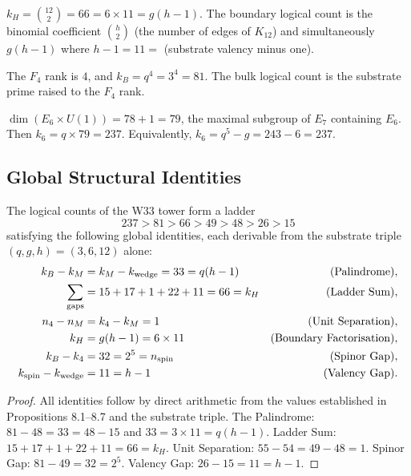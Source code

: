 \begin{proposition}[Boundary: $k_H = 66 = \binom{h}{2} = g(h-1)$]
$k_H = \binom{12}{2} = 66 = 6 \times 11 = g(h-1)$.
The boundary logical count is the binomial coefficient $\binom{h}{2}$
(the number of edges of $K_{12}$) and simultaneously $g(h-1)$
where $h-1 = 11 = $ (substrate valency minus one).
\end{proposition}

\begin{proposition}[Bulk: $k_B = 81 = q^{\mathrm{rank}(F_4)} = 3^4$]
The $F_4$ rank is $4$, and $k_B = q^4 = 3^4 = 81$.
The bulk logical count is the substrate prime raised to the
$F_4$ rank.
\end{proposition}

\begin{proposition}[Sixth: $k_6 = 237 = q \cdot \dim(E_6 \times U(1)) = 3 \times 79$]
$\dim(E_6 \times U(1)) = 78 + 1 = 79$, the maximal subgroup
of $E_7$ containing $E_6$.
Then $k_6 = q \times 79 = 237$.
Equivalently, $k_6 = q^5 - g = 243 - 6 = 237$.
\end{proposition}

\subsection{Global Structural Identities}

\begin{theorem}\label{thm:ladder}
The logical counts of the W33 tower form a ladder
\[
237 > 81 > 66 > 49 > 48 > 26 > 15
\]
satisfying the following global identities, each derivable from
the substrate triple $(q, g, h) = (3, 6, 12)$ alone:
\begin{align}
k_B - k_M &= k_M - k_{\rm wedge} = 33 = q(h-1) &\text{(Palindrome)},\\
\sum_{\rm gaps} &= 15+17+1+22+11 = 66 = k_H &\text{(Ladder Sum)},\\
n_4 - n_M &= k_4 - k_M = 1 &\text{(Unit Separation)},\\
k_H &= g(h-1) = 6 \times 11 &\text{(Boundary Factorisation)},\\
k_B - k_4 &= 32 = 2^5 = n_{\rm spin} &\text{(Spinor Gap)},\\
k_{\rm spin} - k_{\rm wedge} &= 11 = h - 1 &\text{(Valency Gap)}.
\end{align}
\end{theorem}

\begin{proof}
All identities follow by direct arithmetic from the values established
in Propositions 8.1--8.7 and the substrate triple.
The Palindrome: $81-48=33=48-15$ and $33=3\times 11=q(h-1)$.
Ladder Sum: $15+17+1+22+11=66=k_H$.
Unit Separation: $55-54=49-48=1$.
Spinor Gap: $81-49=32=2^5$.
Valency Gap: $26-15=11=h-1$.
\end{proof}

